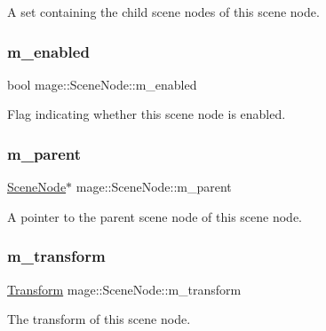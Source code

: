 A set containing the child scene nodes of this scene node. \hypertarget{classmage_1_1_scene_node_a886a097067e1aa22b7803aaf2f5ccbf0}{}\label{classmage_1_1_scene_node_a886a097067e1aa22b7803aaf2f5ccbf0} 
\subsubsection{\texorpdfstring{m\+\_\+enabled}{m\_enabled}}
{\footnotesize\ttfamily bool mage\+::\+Scene\+Node\+::m\+\_\+enabled\hspace{0.3cm}{\ttfamily [private]}}

Flag indicating whether this scene node is enabled. \hypertarget{classmage_1_1_scene_node_a507db45672f28f899f6c7b0f6a292202}{}\label{classmage_1_1_scene_node_a507db45672f28f899f6c7b0f6a292202} 
\subsubsection{\texorpdfstring{m\+\_\+parent}{m\_parent}}
{\footnotesize\ttfamily \hyperlink{classmage_1_1_scene_node}{Scene\+Node}$\ast$ mage\+::\+Scene\+Node\+::m\+\_\+parent\hspace{0.3cm}{\ttfamily [private]}}

A pointer to the parent scene node of this scene node. \hypertarget{classmage_1_1_scene_node_af1384e71b5cc527df881c7272e9fa518}{}\label{classmage_1_1_scene_node_af1384e71b5cc527df881c7272e9fa518} 
\subsubsection{\texorpdfstring{m\+\_\+transform}{m\_transform}}
{\footnotesize\ttfamily \hyperlink{structmage_1_1_transform}{Transform} mage\+::\+Scene\+Node\+::m\+\_\+transform\hspace{0.3cm}{\ttfamily [private]}}

The transform of this scene node. 